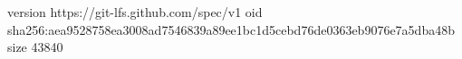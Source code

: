 version https://git-lfs.github.com/spec/v1
oid sha256:aea9528758ea3008ad7546839a89ee1bc1d5cebd76de0363eb9076e7a5dba48b
size 43840
